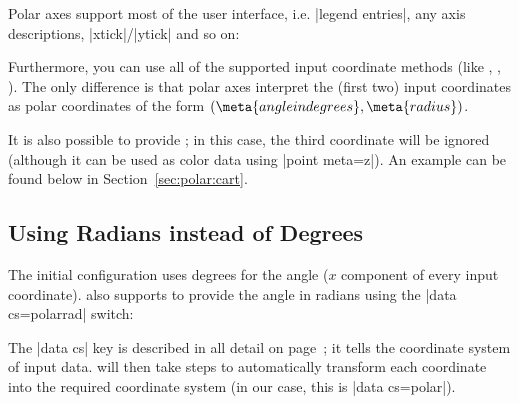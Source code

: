 {Polar axes support most of the \PGFPlots{} user interface, i.e.\@
|legend entries|, any axis descriptions, |xtick|/|ytick| and so on:
%
\begin{codeexample}[]
\end{codeexample}
%
\noindent Furthermore, you can use all of the supported input coordinate
methods (like , ,
). The only difference is that polar axes
interpret the (first two) input coordinates as polar coordinates of the form
$(\meta{angle in degrees},\meta{radius})$.

It is also possible to provide ; in this case, the third
coordinate will be ignored (although it can be used as color data using
|point meta=z|). An example can be found below in Section~\ref{sec:polar:cart}.


\subsection{Using Radians instead of Degrees}

The initial configuration uses degrees for the angle ($x$ component of every
input coordinate). \PGFPlots{} also supports to provide the angle in radians
using the |data cs=polarrad| switch:
%
\begin{codeexample}[]
\end{codeexample}

The |data cs| key is described in all detail on page~\pageref{key:data:cs}; it
tells \PGFPlots{} the coordinate system of input data. \PGFPlots{} will then
take steps to automatically transform each coordinate into the required
coordinate system (in our case, this is |data cs=polar|).


}
